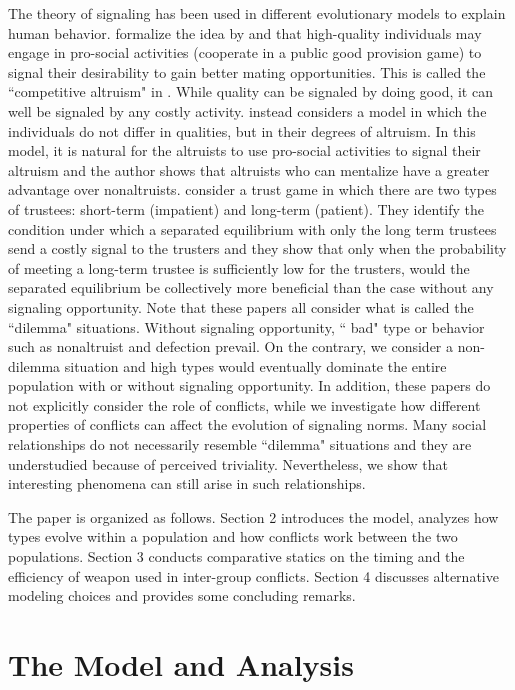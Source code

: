 The theory of signaling has been used in different evolutionary models to explain human behavior. \cite{Gintisetal2001} formalize the idea by \cite{Zahavi1975} and \cite{Miller2000} that high-quality individuals may engage in pro-social activities (cooperate in a public good provision game) to signal their desirability to gain better mating opportunities. This is called the ``competitive altruism" in \cite{Roberts1998}. While quality can be signaled by doing good, it can well be signaled by any costly activity. \cite{Hopkins2014AEJMICRO} instead considers a model in which the individuals do not differ in qualities, but in their degrees of altruism. In this model, it is natural for the altruists to use pro-social activities to signal their altruism and the author shows that altruists who can mentalize have a greater advantage over nonaltruists. \cite{PrzepiorkaDiekmann2021} consider a trust game in which there are two types of trustees: short-term (impatient) and long-term (patient). They identify the condition under which a separated equilibrium with only the long term trustees send a costly signal to the trusters and they show that only when the probability of meeting a long-term trustee is sufficiently low for the trusters, would the separated equilibrium be collectively more beneficial than the case without any signaling opportunity. 
Note that these papers all consider what is called the ``dilemma" situations. Without signaling opportunity, ``
bad" type or behavior such as nonaltruist and defection prevail. On the contrary, we consider a non-dilemma situation and high types would eventually dominate the entire population with or without signaling opportunity.  In addition, these papers do not explicitly consider the role of conflicts, while we investigate how different properties of conflicts can affect the evolution of signaling norms. Many social relationships do not necessarily resemble ``dilemma" situations and they are understudied because of perceived triviality. Nevertheless, we show that interesting phenomena can still arise in such relationships.

The paper is organized as follows. Section 2 introduces the model, analyzes how types evolve within a population and how conflicts work between the two populations. Section 3 conducts comparative statics on the timing and the efficiency of weapon used in inter-group conflicts. Section 4 discusses alternative modeling choices and provides some concluding remarks.


\section{The Model and Analysis}

